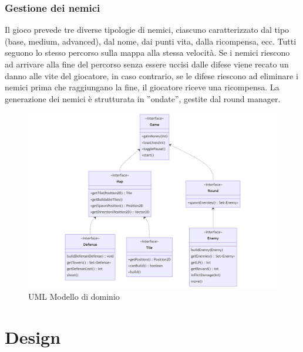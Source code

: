 \documentclass[a4paper,12pt]{report}
\begin{document}
\subsection*{Gestione dei nemici}
Il gioco prevede tre diverse tipologie di nemici, ciascuno caratterizzato dal tipo (base, medium, advanced), dal nome, dai punti vita, dalla ricompensa, ecc.
Tutti seguono lo stesso percorso sulla mappa alla stessa velocità. 
Se i nemici riescono ad arrivare alla fine del percorso senza essere uccisi dalle difese viene recato un danno alle vite del giocatore, in caso contrario, se le difese riescono ad eliminare i nemici prima che raggiungano la fine, il giocatore riceve una ricompensa. 
La generazione dei nemici è strutturata in ”ondate”, gestite dal round manager.

\begin{figure}[H]
    \centering
    \includegraphics[width=\textwidth]{model}
    \caption{UML Modello di dominio}
    \label{fig:model}
\end{figure}

\chapter{Design}
\end{document}
